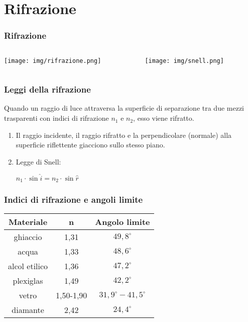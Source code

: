 \documentclass[]{beamer}
\theoremstyle{plain}
\begin{document}
\section{Rifrazione}



\begin{frame}
\frametitle{Rifrazione}
\begin{columns}
\begin{column}{0.3\textwidth}
\texttt{[image: img/rifrazione.png]}
\end{column}
\begin{column}{0.6\textwidth}
\texttt{[image: img/snell.png]}
\end{column}
\end{columns}
\end{frame}


\begin{frame}
\frametitle{Leggi della rifrazione}
Quando un raggio di luce attraversa la superficie di separazione tra due mezzi trasparenti con indici di rifrazione $ n_1 $ e $ n_2 $, esso viene rifratto.
\begin{enumerate}
  \item Il raggio incidente, il raggio rifratto e la perpendicolare (normale) alla superficie riflettente giacciono sullo stesso piano.
  \item Legge di Snell:
  \begin{center}
\colorbox{blue!30}{$ n_1 \cdot \sin \hat{i} = n_2 \cdot\sin \hat{r} $} 
\end{center}
\end{enumerate}
\end{frame}


\begin{frame}
\frametitle{Indici di rifrazione e angoli limite}
\begin{table}[htp]\centering
  \begin{tabular}{ccc}\hline\rule{0pt}{3ex}
        \textbf{Materiale}    & \textbf{n}  & \textbf{Angolo limite}\\\hline\rule{0pt}{3ex}
        ghiaccio      & 1,31      & $ 49,8^\circ $\\\hline\rule{0pt}{3ex}
        acqua         & 1,33      & $ 48,6^\circ $\\\hline\rule{0pt}{3ex}
        alcol etilico & 1,36      & $ 47,2^\circ $ \\\hline\rule{0pt}{3ex}
        plexiglas     & 1,49      & $ 42,2^\circ $\\\hline\rule{0pt}{3ex}
        vetro         & 1,50-1,90 & $ 31,9^\circ-41,5^\circ $\\\hline\rule{0pt}{3ex}
        diamante      & 2,42      & $ 24,4^\circ $\\\hline
  \end{tabular}
\end{table}
\end{frame}
\end{document}
